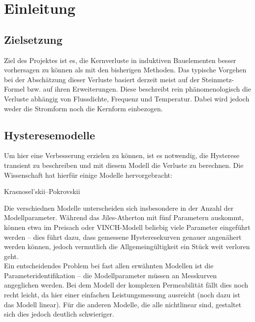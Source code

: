 \documentclass{scrartcl}
\begin{document}
\tableofcontents
\newpage
\section{Einleitung}
\subsection{Zielsetzung}
Ziel des Projektes ist es, die Kernverluste in induktiven Bauelementen besser vorhersagen zu können als mit den bisherigen Methoden. Das typische Vorgehen bei der Abschätzung dieser Verluste basiert derzeit meist auf der Steinmetz-Formel bzw. auf ihren Erweiterungen. Diese beschreibt rein phänomenologisch die Verluste abhängig von Flussdichte, Frequenz und Temperatur. Dabei wird jedoch weder die Stromform noch die Kernform einbezogen.\\
\subsection{Hysteresemodelle}
Um hier eine Verbesserung erzielen zu können, ist es notwendig, die Hysterese transient zu beschreiben und mit diesem Modell die Verluste zu berechnen. Die Wissenschaft hat hierfür einige Modelle hervorgebracht:
\begin{labeling}{Krasnosel’skii–Pokrovskii}
	\item[Komplexe Permeabilität]{}
	\item[Jiles-Atherton]{}
	\item[Preisach]{}
	\item[Coleman-Hodgdon]{}
	\item[Krasnosel’skii–Pokrovskii]{}
	\item[Maxwell-Slip]{}
	\item[Bouc–Wen]{}
	\item[Duhem]{}
	\item[VINCH]{}
\end{labeling}
Die verschiednen Modelle unterscheiden sich insbesondere in der Anzahl der Modellparameter. Während das Jiles-Atherton mit fünf Parametern auskommt, können etwa im Preisach oder VINCH-Modell beliebig viele Parameter eingeführt werden -- dies führt dazu, dass gemessene Hysteresekurven genauer angenähert werden können, jedoch vermutlich die Allgemeingültigkeit ein Stück weit verloren geht.\\
Ein entscheidendes Problem bei fast allen erwähnten Modellen ist die Parameteridentifikation -- die Modellparameter müssen an Messkurven angeglichen werden. Bei dem Modell der komplexen Permeabilität fällt dies noch recht leicht, da hier einer einfachen Leistungsmessung ausreicht (noch dazu ist das Modell linear). Für die anderen Modelle, die alle nichtlinear sind, gestaltet sich dies jedoch deutlich schwieriger.
\end{document}
